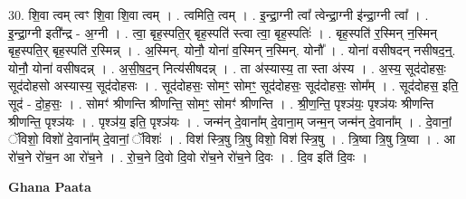\documentclass[17pt]{extarticle}
\begin{document}
30. शि॒वा त्वम् त्वꣳ शि॒वा शि॒वा त्वम् । . त्वमिति॒ त्वम् । . इ॒न्द्रा॒ग्नी त्वा᳚ त्वेन्द्रा॒ग्नी इ॑न्द्रा॒ग्नी त्वा᳚ । . इ॒न्द्रा॒ग्नी इती᳚न्द्र - अ॒ग्नी । . त्वा॒ बृह॒स्पति॒र् बृह॒स्पति॑ स्त्वा त्वा॒ बृह॒स्पतिः॑ । . बृह॒स्पति॑ र॒स्मिन् न॒स्मिन् बृह॒स्पति॒र् बृह॒स्पति॑ र॒स्मिन्न् । . अ॒स्मिन्. योनौ॒ योना॑ व॒स्मिन् न॒स्मिन्. योनौ᳚ । . योना॑ वसीषदन् नसीषद॒न्॒. योनौ॒ योना॑ वसीषदन्न् । . अ॒सी॒ष॒द॒न् नित्य॑सीषदन्न् । . ता अ॑स्यास्य॒ ता स्ता अ॑स्य । . अ॒स्य॒ सूद॑दोहसः॒ सूद॑दोहसो अस्यास्य॒ सूद॑दोहसः । . सूद॑दोहसः॒ सोमꣳ॒॒ सोमꣳ॒॒ सूद॑दोहसः॒ सूद॑दोहसः॒ सोम᳚म् । . सूद॑दोहस॒ इति॒ सूद॑ - दो॒ह॒सः॒ । . सोमꣳ॑ श्रीणन्ति श्रीणन्ति॒ सोमꣳ॒॒ सोमꣳ॑ श्रीणन्ति । . श्री॒ण॒न्ति॒ पृश्ञ॑यः॒ पृश्ञ॑यः श्रीणन्ति श्रीणन्ति॒ पृश्ञ॑यः । . पृश्ञ॑य॒ इति॒ पृश्ञ॑यः । . जन्म॑न् दे॒वाना᳚म् दे॒वाना॒म् जन्म॒न् जन्म॑न् दे॒वाना᳚म् । . दे॒वानां॒ ॅविशो॒ विशो॑ दे॒वाना᳚म् दे॒वानां॒ ॅविशः॑ । . विश॑ स्त्रि॒षु त्रि॒षु विशो॒ विश॑ स्त्रि॒षु । . त्रि॒ष्वा त्रि॒षु त्रि॒ष्वा । . आ रो॑च॒ने रो॑च॒न आ रो॑च॒ने । . रो॒च॒ने दि॒वो दि॒वो रो॑च॒ने रो॑च॒ने दि॒वः । . दि॒व इति॑ दि॒वः । \newline

\textbf{Ghana Paata } \newline
\end{document}

